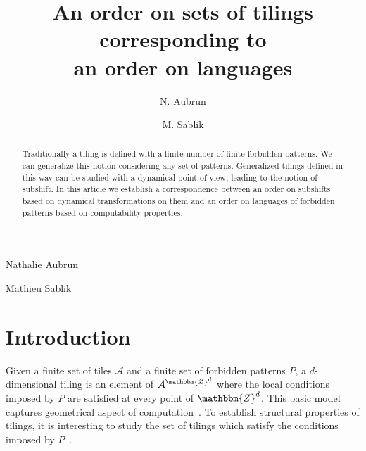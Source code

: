 \documentclass[proceedings]{stacs}
\theoremstyle{plain}\newtheorem{satz}[thm]{Satz}
\theoremstyle{definition}\newtheorem{crucial}[thm]{Crucial Definition}
\newcommand{\Z}{\mathbbm{Z}}
\newcommand{\A}{\mathcal{A}}
\begin{document}
\title[An order on sets of tilings corresponding to an order on languages]{An order on sets of tilings corresponding to \\ an order on languages}

\author[lab1]{N. Aubrun}{Nathalie Aubrun}
\address[lab1]{Institut Gaspard Monge, Universit\'e Paris-Est Marne-la-Vall\'ee,
	 Marne-la-Vallée Cedex 2, France.}    

\author[lab2]{M. Sablik}{Mathieu Sablik}
\address[lab2]{ Laboratoire d'Analyse, Topologie, Probabilit\'e, Universit\'e de Provence,
	, rue F. Joliot Curie, 13453 Marseille Cedex 13, France.}	  








\begin{abstract}
Traditionally a tiling is defined with a finite number of finite forbidden patterns. We can generalize this notion considering any set of patterns. Generalized tilings defined in this way can be studied with a dynamical point of view, leading to the notion of subshift. In this article we establish a correspondence between an order on subshifts based on dynamical transformations on them and an order on languages of forbidden patterns based on computability properties.

\end{abstract}

\maketitle



\vspace{-0,4cm}

\section*{Introduction}\label{S:one}

Given a finite set of tiles $\A$ and a finite set of forbidden patterns $P$, a $d$-dimensional tiling is an element of $\A^{\Z^d}$ where the local conditions imposed by $P$ are satisfied at every point of $\Z^d$. This basic model captures geometrical aspect of computation~\cite{berger1966udp,robinson1971uan,Myers1974}. To establish structural properties of tilings, it is interesting to study the set of tilings which satisfy the conditions imposed by $P$~\cite{ballierstacs2008}. 
\end{document}
